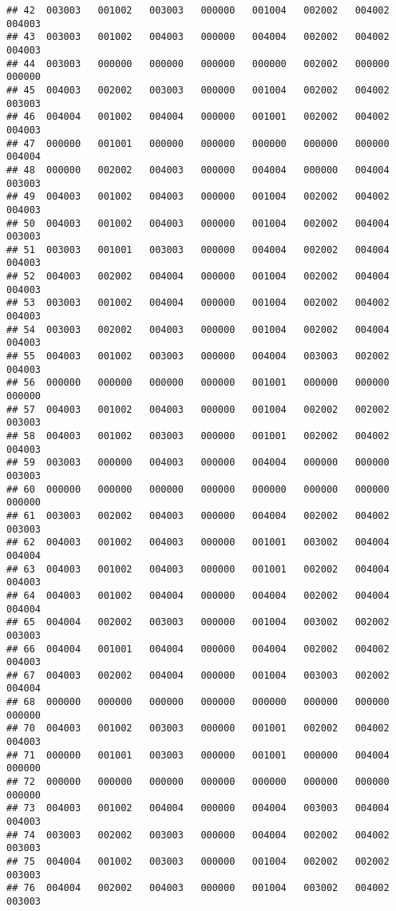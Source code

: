 \documentclass[
]{article}
\begin{document}
\begin{verbatim}
## 42  003003   001002   003003   000000   001004   002002   004002   004003
## 43  003003   001002   004003   000000   004004   002002   004002   004003
## 44  003003   000000   000000   000000   000000   002002   000000   000000
## 45  004003   002002   003003   000000   001004   002002   004002   003003
## 46  004004   001002   004004   000000   001001   002002   004002   004003
## 47  000000   001001   000000   000000   000000   000000   000000   004004
## 48  000000   002002   004003   000000   004004   000000   004004   003003
## 49  004003   001002   004003   000000   001004   002002   004002   004003
## 50  004003   001002   004003   000000   001004   002002   004004   003003
## 51  003003   001001   003003   000000   004004   002002   004004   004003
## 52  004003   002002   004004   000000   001004   002002   004004   004003
## 53  003003   001002   004004   000000   001004   002002   004002   004003
## 54  003003   002002   004003   000000   001004   002002   004004   004003
## 55  004003   001002   003003   000000   004004   003003   002002   004003
## 56  000000   000000   000000   000000   001001   000000   000000   000000
## 57  004003   001002   004003   000000   001004   002002   002002   003003
## 58  004003   001002   003003   000000   001001   002002   004002   004003
## 59  003003   000000   004003   000000   004004   000000   000000   003003
## 60  000000   000000   000000   000000   000000   000000   000000   000000
## 61  003003   002002   004003   000000   004004   002002   004002   003003
## 62  004003   001002   004003   000000   001001   003002   004004   004004
## 63  004003   001002   004003   000000   001001   002002   004004   004003
## 64  004003   001002   004004   000000   004004   002002   004004   004004
## 65  004004   002002   003003   000000   001004   003002   002002   003003
## 66  004004   001001   004004   000000   004004   002002   004002   004003
## 67  004003   002002   004004   000000   001004   003003   002002   004004
## 68  000000   000000   000000   000000   000000   000000   000000   000000
## 70  004003   001002   003003   000000   001001   002002   004002   004003
## 71  000000   001001   003003   000000   001001   000000   004004   000000
## 72  000000   000000   000000   000000   000000   000000   000000   000000
## 73  004003   001002   004004   000000   004004   003003   004004   004003
## 74  003003   002002   003003   000000   004004   002002   004002   003003
## 75  004004   001002   003003   000000   001004   002002   002002   003003
## 76  004004   002002   004003   000000   001004   003002   004002   003003

\end{verbatim}
\end{document}
